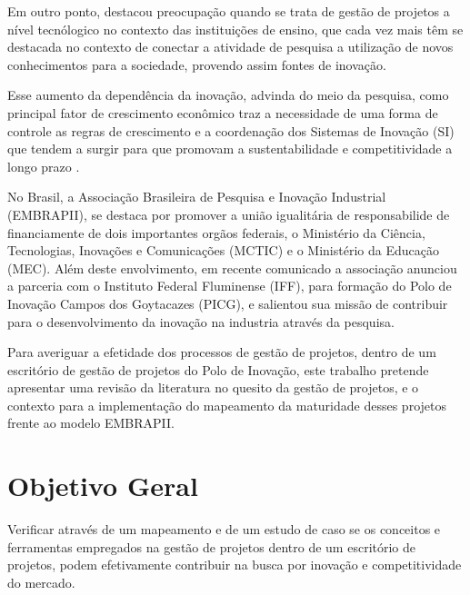Em outro ponto,  destacou preocupação quando se trata de gestão de projetos a nível tecnólogico no contexto das instituições de ensino, que cada vez mais têm se destacada no contexto de conectar a atividade de pesquisa a utilização de novos conhecimentos para a sociedade, provendo assim fontes de inovação.

Esse aumento da dependência da inovação, advinda do meio da pesquisa, como principal fator de crescimento econômico traz a necessidade de uma forma de controle as regras de crescimento e a coordenação dos Sistemas de Inovação (SI) que tendem a surgir para que promovam a sustentabilidade e competitividade a longo prazo \cite{lundvall2010politicas}.

No Brasil, a Associação Brasileira de Pesquisa e Inovação Industrial (EMBRAPII), se destaca por promover a união igualitária de responsabilide de financiamente de dois importantes orgãos federais, o Ministério da Ciência, Tecnologias, Inovações e Comunicações (MCTIC) e o Ministério da Educação (MEC). Além deste envolvimento, em recente comunicado a associação anunciou a parceria com o Instituto Federal Fluminense (IFF), para formação do Polo de Inovação Campos dos Goytacazes (PICG), e salientou sua missão de contribuir para o desenvolvimento da inovação na industria através da pesquisa.

Para averiguar a efetidade dos processos de gestão de projetos, dentro de um escritório de gestão de projetos do Polo de Inovação, este trabalho pretende apresentar uma revisão da literatura no quesito da gestão de projetos, e o contexto para a implementação do mapeamento da maturidade desses projetos frente ao modelo EMBRAPII.


\section{Objetivo Geral}

Verificar através de um mapeamento e de um estudo de caso se os conceitos e ferramentas empregados na gestão de projetos dentro de um escritório de projetos, podem efetivamente contribuir na busca por inovação e competitividade do mercado.


